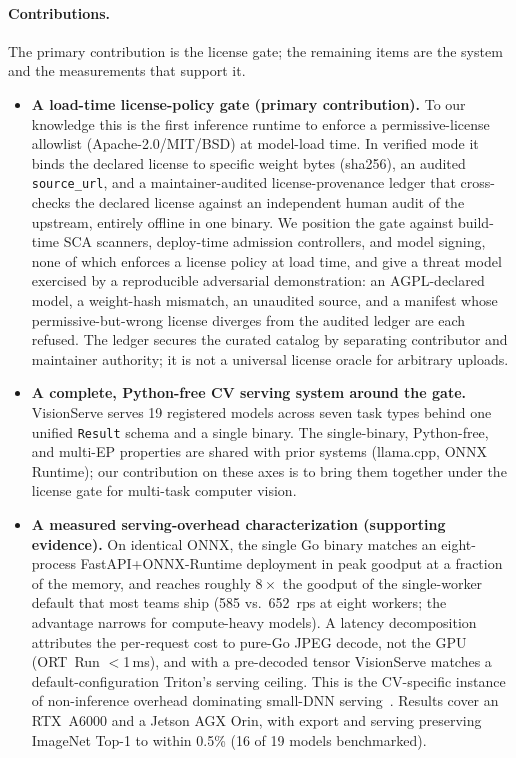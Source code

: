 \paragraph{Contributions.}
The primary contribution is the license gate; the remaining items are the system and the
measurements that support it.

\begin{itemize}
  \item \textbf{A load-time license-policy gate (primary contribution).} To our knowledge this
        is the first inference runtime to enforce a permissive-license allowlist
        (Apache-2.0/MIT/BSD) at model-load time. In verified mode it binds the declared license
        to specific weight bytes (sha256), an audited \texttt{source\_url}, and a
        maintainer-audited license-provenance ledger that cross-checks the declared license
        against an independent human audit of the upstream, entirely offline in one binary. We
        position the gate against build-time SCA scanners, deploy-time admission controllers, and
        model signing, none of which enforces a license policy at load time, and give a threat
        model exercised by a reproducible adversarial demonstration: an AGPL-declared model, a
        weight-hash mismatch, an unaudited source, and a manifest whose permissive-but-wrong
        license diverges from the audited ledger are each refused. The ledger secures the curated
        catalog by separating contributor and maintainer authority; it is not a universal license
        oracle for arbitrary uploads.

  \item \textbf{A complete, Python-free CV serving system around the gate.} VisionServe serves 19
        registered models across seven task types behind one unified \texttt{Result} schema and a
        single binary. The single-binary, Python-free, and multi-EP properties are shared with
        prior systems (llama.cpp, ONNX Runtime); our contribution on these axes is to bring them
        together under the license gate for multi-task computer vision.

  \item \textbf{A measured serving-overhead characterization (supporting evidence).} On identical
        ONNX, the single Go binary matches an eight-process FastAPI+ONNX-Runtime deployment in
        peak goodput at a fraction of the memory, and reaches roughly $8\times$ the goodput of the
        single-worker default that most teams ship (585 vs.\ 652~rps at eight workers; the
        advantage narrows for compute-heavy models). A latency decomposition attributes the
        per-request cost to pure-Go JPEG decode, not the GPU (ORT~Run $<$1\,ms), and with a
        pre-decoded tensor VisionServe matches a default-configuration Triton's serving ceiling.
        This is the CV-specific instance of non-inference overhead dominating small-DNN
        serving~\cite{abouelhamayed2024beyond}. Results cover an RTX~A6000 and a Jetson AGX Orin,
        with export and serving preserving ImageNet Top-1 to within 0.5\% (16 of 19 models
        benchmarked).
\end{itemize}

